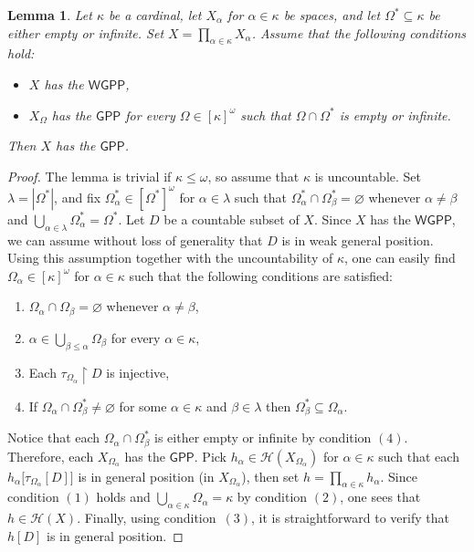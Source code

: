 \documentclass{amsart}
\theoremstyle{plain}
\newtheorem{lemma}[theorem]{Lemma}
\theoremstyle{definition}
\newcommand{\GPP}{\mathsf{GPP}}
\newcommand{\WGPP}{\mathsf{WGPP}}
\newcommand{\HH}{\mathcal{H}}
\begin{document}
\begin{lemma}\label{lemma_gpp}
Let $\kappa$ be a cardinal, let $X_\alpha$ for $\alpha\in\kappa$ be spaces, and let $\Omega^\ast\subseteq\kappa$ be either empty or infinite. Set $X=\prod_{\alpha\in\kappa}X_\alpha$. Assume that the following conditions hold:
\begin{itemize}
\item $X$ has the $\WGPP$,
\item $X_\Omega$ has the $\GPP$ for every $\Omega\in [\kappa]^\omega$ such that $\Omega\cap\Omega^\ast$ is empty or infinite.
\end{itemize}
Then $X$ has the $\GPP$.
\end{lemma}
\begin{proof}
The lemma is trivial if $\kappa\leq\omega$, so assume that $\kappa$ is uncountable. Set $\lambda=|\Omega^\ast|$, and fix $\Omega^\ast_\alpha\in [\Omega^\ast]^\omega$ for $\alpha\in\lambda$ such that $\Omega^\ast_\alpha\cap\Omega^\ast_\beta=\varnothing$ whenever $\alpha\neq\beta$ and $\bigcup_{\alpha\in\lambda}\Omega^\ast_\alpha=\Omega^\ast$. Let $D$ be a countable subset of $X$. Since $X$ has the $\WGPP$, we can assume without loss of generality that $D$ is in weak general position. Using this assumption together with the uncountability of $\kappa$, one can easily find $\Omega_\alpha\in [\kappa]^\omega$ for $\alpha\in\kappa$ such that the following conditions are satisfied:
\begin{enumerate}
\item $\Omega_\alpha\cap\Omega_\beta=\varnothing$ whenever $\alpha\neq\beta$,
\item $\alpha\in\bigcup_{\beta\leq\alpha}\Omega_\beta$ for every $\alpha\in\kappa$,
\item Each $\tau_{\Omega_\alpha}\upharpoonright D$ is injective,
\item If $\Omega_\alpha\cap\Omega^\ast_\beta\neq\varnothing$ for some $\alpha\in\kappa$ and $\beta\in\lambda$ then $\Omega^\ast_\beta\subseteq\Omega_\alpha$.
\end{enumerate}

Notice that each $\Omega_\alpha\cap\Omega^\ast_\beta$ is either empty or infinite by condition $(4)$. Therefore, each $X_{\Omega_\alpha}$ has the $\GPP$. Pick $h_\alpha\in\HH(X_{\Omega_\alpha})$ for $\alpha\in\kappa$ such that each $h_\alpha\big[\tau_{\Omega_\alpha}[D]\big]$ is in general position (in $X_{\Omega_\alpha}$), then set $h=\prod_{\alpha\in\kappa}h_\alpha$. Since condition $(1)$ holds and $\bigcup_{\alpha\in\kappa}\Omega_\alpha=\kappa$ by condition $(2)$, one sees that $h\in\HH(X)$. Finally, using condition~$(3)$, it is straightforward to verify that $h[D]$ is in general position.
\end{proof}
\end{document}
